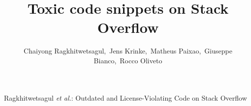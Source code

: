 \documentclass[10pt,journal,compsoc]{IEEEtran}
\begin{document}
\title{Toxic code snippets on Stack Overflow}

\author{Chaiyong Ragkhitwetsagul,~Jens Krinke,~Matheus Paixao,~Giuseppe Bianco,~Rocco Oliveto}

%
{Ragkhitwetsagul \MakeLowercase{\textit{et al.}}: Outdated and License-Violating Code on Stack Overflow}
% 

\end{document}
